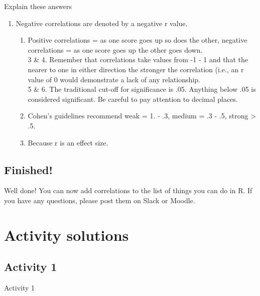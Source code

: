 \documentclass[]{book}
\providecommand{\tightlist}{%
  \setlength{\itemsep}{0pt}\setlength{\parskip}{0pt}}
\begin{document}
Explain these answers

\begin{enumerate}
\def\labelenumi{\arabic{enumi}.}
\tightlist
\item
  Negative correlations are denoted by a negative r value.

  \begin{enumerate}
  \def\labelenumii{\arabic{enumii}.}
  \setcounter{enumii}{1}
  \tightlist
  \item
    Positive correlations = as one score goes up so does the other, negative correlations = as one score goes up the other goes down.\\
    3 \& 4. Remember that correlations take values from -1 - 1 and that the nearer to one in either direction the stronger the correlation (i.e., an r value of 0 would demonstrate a lack of any relationship.\\
    5 \& 6. The traditional cut-off for significance is .05. Anything below .05 is considered significant. Be careful to pay attention to decimal places.\\
  \item
    Cohen's guidelines recommend weak = 1. - .3, medium = .3 - .5, strong \textgreater{} .5.\\
  \item
    Because r is an effect size.
  \end{enumerate}
\end{enumerate}

\hypertarget{finished-4}{%
\subsection{Finished!}\label{finished-4}}

Well done! You can now add correlations to the list of things you can do in R. If you have any questions, please post them on Slack or Moodle.

\hypertarget{activity-solutions-3}{%
\section{Activity solutions}\label{activity-solutions-3}}

\hypertarget{activity-1-1}{%
\subsection{Activity 1}\label{activity-1-1}}

Activity 1
\end{document}
